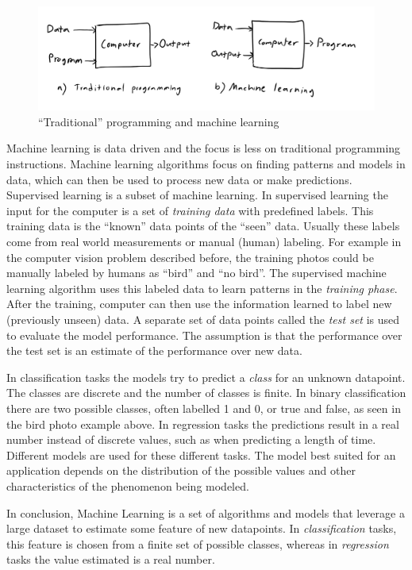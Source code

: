 \begin{figure}[htb]
\centering \includegraphics[width=0.9\linewidth]{gfx/figures/traditionalvsml.png}
\caption{``Traditional'' programming and machine learning}
\label{fig:traditionalvsml}
\end{figure}


Machine learning is data driven and the focus is less on traditional programming instructions.
Machine learning algorithms focus on finding patterns and models in data,
which can then be used to process new data or make predictions.
Supervised learning is a subset of machine learning. 
In supervised learning the input for the computer is a set of \textit{training data} with predefined labels. 
This training data is the ``known'' data points of the ``seen'' data.
Usually these labels come from real world measurements or manual (human) labeling.
For example in the computer vision problem described before, the training photos could be manually labeled by humans as ``bird'' and ``no bird''.
The supervised machine learning algorithm uses this labeled data to learn patterns in the \emph{training phase}. After the training, computer can then use the information learned to label new (previously unseen) data.
A separate set of data points called the \emph{test set} is used to evaluate the model performance.
The assumption is that the performance over the test set is an estimate of the performance over new data.

In classification tasks the models try to predict a \emph{class} for an unknown datapoint. The classes are discrete and the number of classes is finite. In binary classification there are two possible classes, often labelled 1 and 0, or true and false, as seen in the bird photo example above. In regression tasks the predictions result in a real number instead of discrete values, such as when predicting a length of time.
Different models are used for these different tasks.
The model best suited for an application depends on the distribution of the possible values and other characteristics of the phenomenon being modeled.

In conclusion, Machine Learning is a set of algorithms and models that leverage a large dataset to estimate some feature of new datapoints.
In \textit{classification} tasks, this feature is chosen from a finite set of possible classes, whereas in \textit{regression} tasks the value estimated is a real number.

